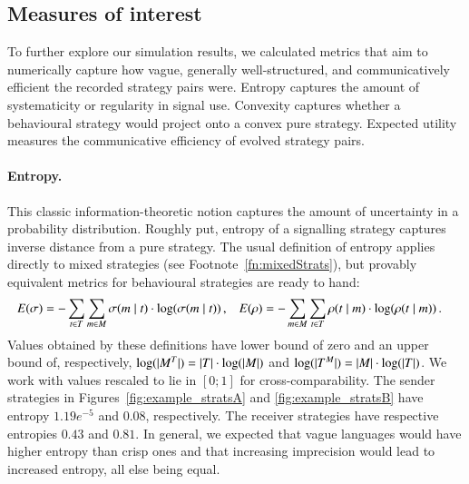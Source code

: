 \documentclass[12pt,english]{article}
\numberwithin{equation}{section}
\begin{document}
\subsection{Measures of interest}
 
To further explore our simulation results, we calculated metrics that aim to numerically
capture how vague, generally well-structured, and communicatively efficient the recorded
strategy pairs were. Entropy captures the amount of systematicity or regularity in signal
use. Convexity captures whether a behavioural strategy would project onto a convex pure
strategy. Expected utility measures the communicative efficiency of evolved strategy pairs.

\paragraph{Entropy.} This classic information-theoretic notion captures the amount of
uncertainty in a probability distribution. Roughly put, entropy of a signalling strategy
captures inverse distance from a pure strategy. The usual definition of entropy applies
directly to mixed strategies (see Footnote~\ref{fn:mixedStrats}), but provably equivalent
metrics for behavioural strategies are ready to hand:
\begin{align*}
  E(\sigma) & = -\sum_{t \in T} \sum_{m \in M}
  \sigma(m \mid t) \cdot \log(\sigma(m \mid
  t))\,, &
  E(\rho) & = -\sum_{m \in M} \sum_{t \in T}
  \rho(t \mid m) \cdot \log(\rho(t \mid
  m)) \,. 
\end{align*}
Values obtained by these definitions have lower bound of zero and an upper bound of,
respectively, $\log(|M^T|) = |T| \cdot \log(|M|)$ and
$\log(|T^M|) = |M| \cdot \log(|T|)$. We work with values rescaled to
lie in $[0;1]$ for cross-comparability. The sender strategies in
Figures~\ref{fig:example_stratsA} and \ref{fig:example_stratsB} have entropy $1.19e^{-5}$ and
$0.08$, respectively. The receiver strategies have respective entropies $0.43$ and $0.81$. In
general, we expected that vague languages would have higher entropy than crisp ones and that
increasing imprecision would lead to increased entropy, all else being equal.
\end{document}
